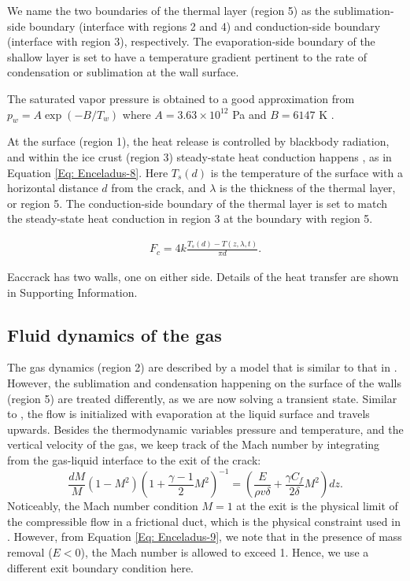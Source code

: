 \documentclass[draft]{agujournal2019}
\begin{document}
We name the two boundaries of the thermal layer (region 5) as the sublimation-side boundary (interface with regions 2 and 4) and conduction-side boundary (interface with region 3), respectively. The evaporation-side boundary of the shallow layer is set to have a temperature gradient pertinent to the rate of condensation or sublimation at the wall surface.

The saturated vapor pressure is obtained to a good approximation from $p_w=A\exp\left(-B/T_w\right)$ where $A=3.63\times 10^{12}$ Pa and $B=6147$ K \cite{nakajima2016controlled}.

At the surface (region 1), the heat release is controlled by blackbody radiation, and within the ice crust (region 3) steady-state heat conduction happens \cite{ingersoll2010subsurface}, as in Equation
\ref{Eq: Enceladus-8}. Here $T_s(d)$ is the temperature of the surface with a horizontal distance $d$ from the crack, and $\lambda$ is the thickness of the thermal layer, or region 5. The conduction-side boundary of the thermal layer is set to match the steady-state heat conduction in region 3 at the boundary with region 5.

\begin{eqnarray}
    F_c = 4k \frac{T_s(d) - T(z,\lambda,t)}{\pi d}.
\label{Eq: Enceladus-8}
\end{eqnarray}

Eaccrack has two walls, one on either side. Details of the heat transfer are shown in Supporting Information.

\subsection{Fluid dynamics of the gas}
The gas dynamics (region 2) are described by a model that is similar to that in . However, the sublimation and condensation happening on the surface of the walls (region 5) are treated differently, as we are now solving a transient state. Similar to , the flow is initialized with evaporation at the liquid surface and travels upwards. Besides the thermodynamic variables pressure and temperature, and the vertical velocity of the gas, we keep track of the Mach number by integrating from the gas-liquid interface to the exit of the crack:
\begin{equation}
    \frac{dM}{M} (1 - M^2) \left( 1 + \frac{\gamma - 1}{2} M^2 \right)^{-1} = \left( \frac{E}{\rho v \delta} + \frac{\gamma C_f}{2\delta} M^2 \right) dz
    \label{Eq: Enceladus-9}.
\end{equation}
Noticeably, the Mach number condition $M=1$ at the exit is the physical limit of the compressible flow in a frictional duct, which is the physical constraint used in . However, from Equation \ref{Eq: Enceladus-9}, we note that in the presence of mass removal ($E<0$), the Mach number is allowed to exceed 1. Hence, we use a different exit boundary condition here.
\end{document}
